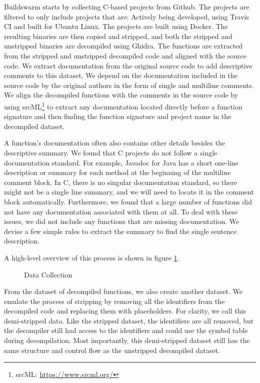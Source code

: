 Buildswarm starts by collecting C-based projects from Github. The projects are filtered to only include projects that are: Actively being developed, using Travis CI and built for Ubuntu Linux. The projects are built using Docker. The resulting binaries are then copied and stripped, and both the stripped and unstripped binaries are decompiled using Ghidra. The functions are extracted from the stripped and unstripped decompiled code and aligned with the source code. 
We extract documentation from the original source code to add descriptive comments to this dataset. We depend on the documentation included in the source code by the original authors in the form of single and multiline comments. We align the decompiled functions with the comments in the source code by using srcML\footnote{srcML: \url{https://www.srcml.org/}} to extract any documentation located directly before a function signature and then finding the function signature and project name in the decompiled dataset.

A function's documentation often also contains other details besides the descriptive summary. We found that C projects do not follow a single documentation standard. For example, Javadoc for Java has a short one-line description or summary for each method at the beginning of the multiline comment block. In C, there is no singular documentation standard, so there might not be a single line summary, and we will need to locate it in the comment block automatically. 
Furthermore, we found that a large number of functions did not have any documentation associated with them at all. To deal with these issues, we did not include any functions that are missing documentation. We devise a few simple rules to extract the summary to find the single sentence description.

A high-level overview of this process is shown in figure \ref{fig:dataCollection}.

\begin{figure}[tbh]
  \centering
  
  \caption{Data Collection}
  \label{fig:dataCollection}
\end{figure}

From the dataset of decompiled functions, we also create another dataset. We emulate the process of stripping by removing all the identifiers from the decompiled code and replacing them with placeholders. For clarity, we call this demi-stripped data. Like the stripped dataset, the identifiers are all removed, but the decompiler still had access to the identifiers and could use the symbol table during decompilation. Most importantly, this demi-stripped dataset still has the same structure and control flow as the unstripped decompiled dataset.

